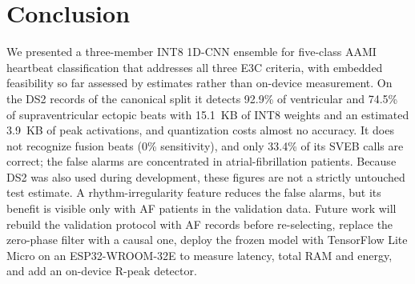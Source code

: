 \documentclass[conference]{IEEEtran}
\begin{document}
\section{Conclusion}
We presented a three-member INT8 1D-CNN ensemble for five-class AAMI heartbeat classification that addresses all three E3C criteria, with embedded feasibility so far assessed by estimates rather than on-device measurement. On the DS2 records of the canonical split it detects 92.9\% of ventricular and 74.5\% of supraventricular ectopic beats with 15.1~KB of INT8 weights and an estimated 3.9~KB of peak activations, and quantization costs almost no accuracy. It does not recognize fusion beats (0\% sensitivity), and only 33.4\% of its SVEB calls are correct; the false alarms are concentrated in atrial-fibrillation patients. Because DS2 was also used during development, these figures are not a strictly untouched test estimate. A rhythm-irregularity feature reduces the false alarms, but its benefit is visible only with AF patients in the validation data. Future work will rebuild the validation protocol with AF records before re-selecting, replace the zero-phase filter with a causal one, deploy the frozen model with TensorFlow Lite Micro on an ESP32-WROOM-32E to measure latency, total RAM and energy, and add an on-device R-peak detector.



\end{document}
